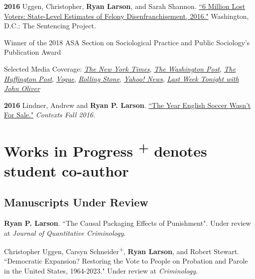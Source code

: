 \documentclass[letterpaper]{article}
\newenvironment{publist}{%
  \begin{list}{}{%
    \setlength{\leftmargin}{0cm}   %
    \setlength{\labelwidth}{2cm}     %
    \setlength{\labelsep}{0.5cm}     %
  }%
}{%
  \end{list}%
}
\renewenvironment{itemize}{
  \begin{list}{}{
    \setlength{\leftmargin}{1.5em}
  }
}{
  \end{list}
}
\begin{document}
\begin{publist}
\item[\textbf{2016}] Uggen, Christopher, \textbf{Ryan Larson}, and Sarah Shannon. \href{http://www.sentencingproject.org/wp-content/uploads/2016/10/6-Million-Lost-Voters.pdf}{``6 Million Lost Voters: State-Level Estimates of Felony Disenfranchisement, 2016."} Washington, D.C.: The Sentencing Project.
\begin{itemize}
\item Winner of the 2018 ASA Section on Sociological Practice and Public Sociology's Publication Award
\item Selected Media Coverage: \href{http://www.nytimes.com/interactive/2016/10/06/us/unequal-effect-of-laws-that-block-felons-from-voting.html?_r=0}{\textit{The New York Times}}, \href{https://www.washingtonpost.com/news/powerpost/wp/2016/10/07/6-million-citizens-including-1-in-13-african-americans-are-blocked-from-voting-because-of-felonies/}{\textit{The Washington Post}}, \href{http://www.huffingtonpost.com/harlan-green/trump-the-terrible-demago_b_12392904.html}{\textit{The Huffington Post}}, \href{http://www.vogue.com/13489654/2016-presidential-election-felony-disenfranchisement/}{\textit{Vogue}}, \href{http://www.rollingstone.com/politics/features/six-million-adults-who-wont-influence-this-election-w443693}{\textit{Rolling Stone}}, \href{https://www.yahoo.com/news/more-6-million-americans-t-vote-election-105300558.html}{\textit{Yahoo! News}}, \href{https://www.youtube.com/watch?time_continue=2&v=NpPyLcQ2vdI}{\textit{Last Week Tonight with John Oliver}}
\end{itemize}

\item[\textbf{2016}] Lindner, Andrew and \textbf{Ryan P. Larson}. \href{http://journals.sagepub.com/doi/full/10.1177/1536504216685127}{``The Year English Soccer Wasn't For Sale."} \textit{Contexts Fall 2016}. 

\end{publist}


\section*{\textbf{Works in Progress} \scriptsize{\textsuperscript{+} denotes student co-author}}

\subsection*{Manuscripts Under Review}
\begin{publist}

\item \textbf{Ryan P. Larson}. ``The Causal Packaging Effects of Punishment". Under review at \textit{Journal of Quantitative Criminology}.

\item Christopher Uggen, Carsyn Schneider\textsuperscript{+}, \textbf{Ryan Larson}, and Robert Stewart. ``Democratic Expansion? Restoring the Vote to People on Probation and Parole in the United States, 1964-2023." Under review at \textit{Criminology}.


\end{publist}
\end{document}

